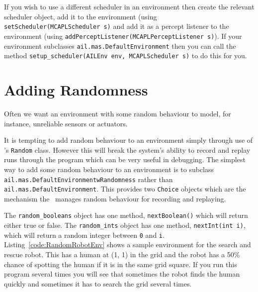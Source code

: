 \documentclass[a4]{article}
\begin{document}
\begin{sloppypar}
If you wish to use a different scheduler in an environment then create the relevant scheduler object, add it to the environment (using \texttt{setScheduler(MCAPLScheduler s)} and add it as a percept listener to the environment (using \texttt{addPerceptListener(MCAPLPerceptListener s)}).  If your environment subclasses \texttt{ail.mas.DefaultEnvironment} then you can call the method \texttt{setup\_scheduler(AILEnv env, MCAPLScheduler s)} to do this for you.
\end{sloppypar}

\section{Adding Randomness}

Often we want an environment with some random behaviour to model, for instance, unreliable sensors or actuators.

\begin{sloppypar}
It is tempting to add random behaviour to an environment simply through use of \java's \texttt{Random} class.  However this will break the system's ability to record and replay runs through the program which can be very useful in debugging.  The simplest way to add some random behaviour to an environment is to subclass \texttt{ail.mas.DefaultEnvironmentwRandomness} rather than \texttt{ail.mas.DefaultEnvironment}.  This provides two \texttt{Choice} objects which are the mechanism the \ail\ manages random behaviour for recording and replaying.
\end{sloppypar}

The \texttt{random\_booleans} object has one method, \texttt{nextBoolean()} which will return either true or false.  The \texttt{random\_ints} object has one method, \texttt{nextInt(int i)}, which will return a random integer between \texttt{0} and \texttt{i}.  Listing~\ref{code:RandomRobotEnv} shows a sample environment for the search and rescue robot.  This has a human at (1, 1) in the grid and the robot has a 50\% chance of spotting the human if it is in the same grid square.   If you run this program several times you will see that sometimes the robot finds the human quickly and sometimes it has to search the grid several times.
\end{document}
